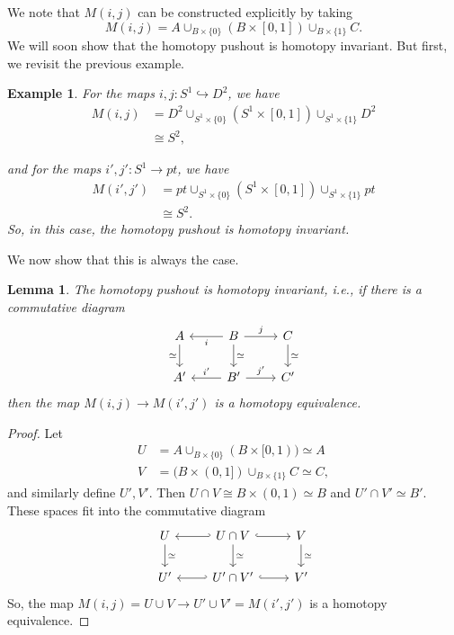 \documentclass{article}
\newtheorem{lemma}[theorem]{Lemma}
\newtheorem{example}[theorem]{Example}
\newtheorem{proposed work}[theorem]{Proposed Work}
\theoremstyle{definition}
\begin{document}
We note that $M(i,j)$ can be constructed explicitly by taking
\begin{equation*}
M(i,j) = A \cup_{B \times \{0\}} (B \times [0,1]) \cup_{B \times \{1\}} C.
\end{equation*}
We will soon show that the homotopy pushout is homotopy invariant. But first, we revisit the previous example. 

\begin{example}
For the maps $i,j: S^1 \hookrightarrow D^2$, we have
\begin{align*}
M(i,j) &= D^2 \cup_{S^1 \times \{0\}} (S^1 \times [0,1]) \cup_{S^1 \times \{1\}} D^2 \\
&\cong S^2,
\end{align*}

and for the maps $i', j': S^1 \to pt$, we have
\begin{align*}
M(i',j') &= pt \cup_{S^1 \times \{0\}} (S^1 \times [0,1]) \cup_{S^1 \times \{1\}} pt \\
&\cong S^2.
\end{align*}
So, in this case, the homotopy pushout is homotopy invariant. 
\end{example}

We now show that this is always the case.

\begin{lemma}\label{hompoinvar}
The homotopy pushout is homotopy invariant, i.e., if there is a commutative diagram
\begin{equation*}
\begin{tikzcd}
A \arrow[d,swap, "\simeq"] & B \arrow[l, "i"] \arrow[r, "j"] \arrow[d, "\simeq"]& C \arrow[d, "\simeq"] \\
A' & B' \arrow[l,swap, "i'"] \arrow[r, "j'"] & C'
\end{tikzcd}
\end{equation*}
then the map $M(i,j) \to M(i',j')$ is a homotopy equivalence. 
\end{lemma}

\begin{proof}
Let 
\begin{align*}
U &= A \cup_{B \times \{0\}} (B \times [0,1)) \simeq A\\
V &= (B \times (0,1]) \cup_{B \times\{1\}} C \simeq C,
\end{align*}
and similarly define $U', V'$. Then $U \cap V \cong B \times (0,1) \simeq B$ and $U' \cap V' \simeq B'$. These spaces fit into the commutative diagram
\begin{equation*}
\begin{tikzcd}
U \arrow[d, "\simeq"] & U \cap V \arrow[l, hook'] \arrow[r, hook] \arrow[d, "\simeq"] & V \arrow[d, "\simeq"] \\
U' & U' \cap V' \arrow[l, hook'] \arrow[r,hook] & V'
\end{tikzcd}
\end{equation*}
So, the map $M(i,j) = U \cup V \to U' \cup V' = M(i',j')$ is a homotopy equivalence.
\end{proof}
\end{document}
